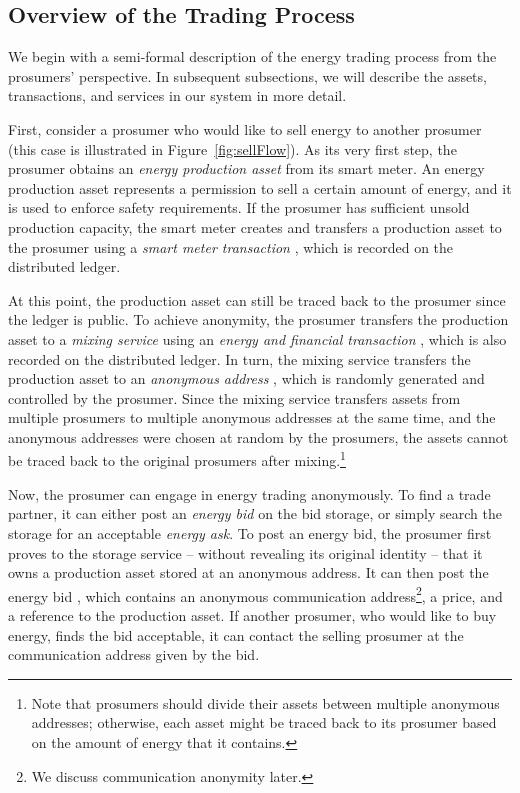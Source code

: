 \subsection{Overview of the Trading Process}
We begin with a semi-formal description of the energy trading process from the prosumers' perspective.
In subsequent subsections, we will describe the assets, transactions, and services in our system in more detail.

First, consider a prosumer who would like to sell energy to another prosumer (this case is illustrated in Figure~\ref{fig:sellFlow}).
As its very first step, the prosumer obtains an \emph{energy production asset} from its smart meter.
An energy production asset represents a permission to sell a certain amount of energy, and it is used to enforce safety requirements.
If the prosumer has sufficient unsold production capacity, the smart meter creates and transfers a production asset to the prosumer using a \emph{smart meter transaction} , which is recorded on the distributed ledger.

At this point, the production asset can still be traced back to the prosumer since the ledger is public.
To achieve anonymity, the prosumer transfers the production asset to a \emph{mixing service} using an \emph{energy and financial transaction} , which is also recorded on the distributed ledger.
In turn, the mixing service transfers the production asset to an \emph{anonymous address} , which is randomly generated and controlled by the prosumer.
Since the mixing service transfers assets from multiple prosumers to multiple anonymous addresses at the same time, and the anonymous addresses were chosen at random by the prosumers, the assets cannot be traced back to the original prosumers after mixing.\footnote{Note that prosumers should divide their assets between multiple anonymous addresses; otherwise, each asset might be traced back to its prosumer based on the amount of energy that it contains.}

Now, the prosumer can engage in energy trading anonymously.
To find a trade partner, it can either post an \emph{energy bid} on the bid storage, or simply search the storage for an acceptable \emph{energy ask}.
To post an energy bid, the prosumer first proves to the storage service -- without revealing its original identity -- that it owns a production asset stored at an anonymous address.
It can then post the energy bid , which contains an anonymous communication address\footnote{We discuss communication anonymity later.}, a price, and a reference to the production asset.
If another prosumer, who would like to buy energy, finds the bid acceptable, it can contact the selling prosumer at the communication address given by the bid.

